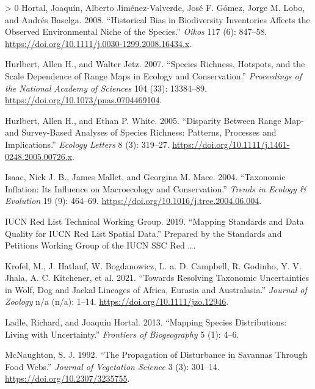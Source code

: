 \documentclass[10pt,oneside]{article}
\newlength{\cslhangindent}
\newenvironment{CSLReferences}[3] %
 {%
  \setlength{\parindent}{0pt}
  \ifodd #1 \everypar{\setlength{\hangindent}{\cslhangindent}}\ignorespaces\fi
  \ifnum #2 > 0
  \setlength{\parskip}{#2\baselineskip}
  \fi
 }%
 {}
\begin{document}
\begin{CSLReferences}{1}{0}
\leavevmode\hypertarget{ref-Hortal2008HisBia}{}%
Hortal, Joaquín, Alberto Jiménez-Valverde, José F. Gómez, Jorge M. Lobo,
and Andrés Baselga. 2008. {``Historical Bias in Biodiversity Inventories
Affects the Observed Environmental Niche of the Species.''} \emph{Oikos}
117 (6): 847--58.
\url{https://doi.org/10.1111/j.0030-1299.2008.16434.x}.

\leavevmode\hypertarget{ref-Hurlbert2007SpeRic}{}%
Hurlbert, Allen H., and Walter Jetz. 2007. {``Species Richness,
Hotspots, and the Scale Dependence of Range Maps in Ecology and
Conservation.''} \emph{Proceedings of the National Academy of Sciences}
104 (33): 13384--89. \url{https://doi.org/10.1073/pnas.0704469104}.

\leavevmode\hypertarget{ref-Hurlbert2005DisRan}{}%
Hurlbert, Allen H., and Ethan P. White. 2005. {``Disparity Between Range
Map- and Survey-Based Analyses of Species Richness: Patterns, Processes
and Implications.''} \emph{Ecology Letters} 8 (3): 319--27.
\url{https://doi.org/10.1111/j.1461-0248.2005.00726.x}.

\leavevmode\hypertarget{ref-Isaac2004TaxInf}{}%
Isaac, Nick J. B., James Mallet, and Georgina M. Mace. 2004.
{``Taxonomic Inflation: Its Influence on Macroecology and
Conservation.''} \emph{Trends in Ecology \& Evolution} 19 (9): 464--69.
\url{https://doi.org/10.1016/j.tree.2004.06.004}.

\leavevmode\hypertarget{ref-IUCN2019MapSta}{}%
IUCN Red List Technical Working Group. 2019. {``Mapping Standards and
Data Quality for IUCN Red List Spatial Data.''} Prepared by the
Standards and Petitions Working Group of the IUCN SSC Red \ldots.

\leavevmode\hypertarget{ref-Krofel2021ResTax}{}%
Krofel, M., J. Hatlauf, W. Bogdanowicz, L. a. D. Campbell, R. Godinho,
Y. V. Jhala, A. C. Kitchener, et al. 2021. {``Towards Resolving
Taxonomic Uncertainties in Wolf, Dog and Jackal Lineages of Africa,
Eurasia and Australasia.''} \emph{Journal of Zoology} n/a (n/a): 1--14.
\url{https://doi.org/10.1111/jzo.12946}.

\leavevmode\hypertarget{ref-Ladle2013MapSpe}{}%
Ladle, Richard, and Joaquín Hortal. 2013. {``Mapping Species
Distributions: Living with Uncertainty.''} \emph{Frontiers of
Biogeography} 5 (1): 4--6.

\leavevmode\hypertarget{ref-McNaughton1992ProDis}{}%
McNaughton, S. J. 1992. {``The Propagation of Disturbance in Savannas
Through Food Webs.''} \emph{Journal of Vegetation Science} 3 (3):
301--14. \url{https://doi.org/10.2307/3235755}.


\end{CSLReferences}
\end{document}
